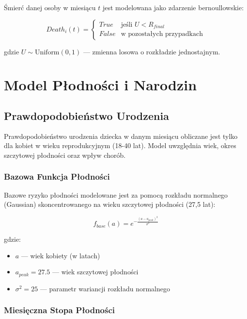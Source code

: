\documentclass[]{article}
\begin{document}
Śmierć danej osoby w miesiącu $t$ jest modelowana jako zdarzenie bernoullowskie:

\begin{equation}
Death_i(t) = \begin{cases}
True & \text{jeśli } U < R_{final} \\
False & \text{w pozostałych przypadkach}
\end{cases}
\end{equation}

gdzie $U \sim \text{Uniform}(0,1)$ --- zmienna losowa o rozkładzie jednostajnym.

\section{Model Płodności i Narodzin}

\subsection{Prawdopodobieństwo Urodzenia}

Prawdopodobieństwo urodzenia dziecka w danym miesiącu obliczane jest tylko dla kobiet w wieku reprodukcyjnym (18-40 lat). Model uwzględnia wiek, okres szczytowej płodności oraz wpływ chorób.

\subsubsection{Bazowa Funkcja Płodności}

Bazowe ryzyko płodności modelowane jest za pomocą rozkładu normalnego (Gaussian) skoncentrowanego na wieku szczytowej płodności (27,5 lat):

\begin{equation}
f_{base}(a) = e^{-\frac{(a - a_{peak})^2}{\sigma^2}}
\end{equation}

gdzie:
\begin{itemize}
    \item $a$ --- wiek kobiety (w latach)
    \item $a_{peak} = 27.5$ --- wiek szczytowej płodności
    \item $\sigma^2 = 25$ --- parametr wariancji rozkładu normalnego
\end{itemize}

\subsubsection{Miesięczna Stopa Płodności}
\end{document}
